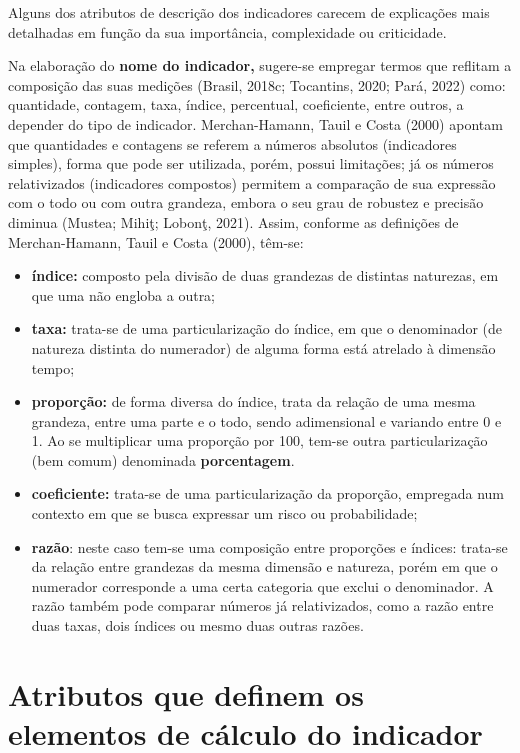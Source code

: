 \documentclass[
  letterpaper,
  DIV=11,
  numbers=noendperiod]{scrreprt}
\begin{document}
Alguns dos atributos de descrição dos indicadores carecem de explicações
mais detalhadas em função da sua importância, complexidade ou
criticidade.

Na elaboração do \textbf{nome do indicador,} sugere-se empregar termos
que reflitam a composição das suas medições (Brasil, 2018c; Tocantins,
2020; Pará, 2022) como: quantidade, contagem, taxa, índice, percentual,
coeficiente, entre outros, a depender do tipo de indicador.
Merchan-Hamann, Tauil e Costa (2000) apontam que quantidades e contagens
se referem a números absolutos (indicadores simples), forma que pode ser
utilizada, porém, possui limitações; já os números relativizados
(indicadores compostos) permitem a comparação de sua expressão com o
todo ou com outra grandeza, embora o seu grau de robustez e precisão
diminua (Mustea; Mihiţ; Lobonţ, 2021). Assim, conforme as definições de
Merchan-Hamann, Tauil e Costa (2000), têm-se:

\begin{itemize}
\item
  \textbf{índice:} composto pela divisão de duas grandezas de distintas
  naturezas, em que uma não engloba a outra;
\item
  \textbf{taxa:} trata-se de uma particularização do índice, em que o
  denominador (de natureza distinta do numerador) de alguma forma está
  atrelado à dimensão tempo;
\item
  \textbf{proporção:} de forma diversa do índice, trata da relação de
  uma mesma grandeza, entre uma parte e o todo, sendo adimensional e
  variando entre 0 e 1. Ao se multiplicar uma proporção por 100, tem-se
  outra particularização (bem comum) denominada \textbf{porcentagem}.
\item
  \textbf{coeficiente:} trata-se de uma particularização da proporção,
  empregada num contexto em que se busca expressar um risco ou
  probabilidade;
\item
  \textbf{razão}: neste caso tem-se uma composição entre proporções e
  índices: trata-se da relação entre grandezas da mesma dimensão e
  natureza, porém em que o numerador corresponde a uma certa categoria
  que exclui o denominador. A razão também pode comparar números já
  relativizados, como a razão entre duas taxas, dois índices ou mesmo
  duas outras razões.
\end{itemize}

\hypertarget{atributos-que-definem-os-elementos-de-cuxe1lculo-do-indicador}{%
\section{Atributos que definem os elementos de cálculo do
indicador}\label{atributos-que-definem-os-elementos-de-cuxe1lculo-do-indicador}}
\end{document}
